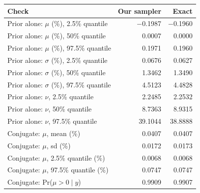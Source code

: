 \begin{tabular}{lrr}
\toprule
Check & Our sampler & Exact \\
\midrule
Prior alone: $\mu$ (\%), 2.5\% quantile & $-$0.1987 & $-$0.1960 \\
Prior alone: $\mu$ (\%), 50\% quantile & 0.0007 & 0.0000 \\
Prior alone: $\mu$ (\%), 97.5\% quantile & 0.1971 & 0.1960 \\
Prior alone: $\sigma$ (\%), 2.5\% quantile & 0.0676 & 0.0627 \\
Prior alone: $\sigma$ (\%), 50\% quantile & 1.3462 & 1.3490 \\
Prior alone: $\sigma$ (\%), 97.5\% quantile & 4.5123 & 4.4828 \\
Prior alone: $\nu$, 2.5\% quantile & 2.2485 & 2.2532 \\
Prior alone: $\nu$, 50\% quantile & 8.7363 & 8.9315 \\
Prior alone: $\nu$, 97.5\% quantile & 39.1044 & 38.8888 \\
Conjugate: $\mu$, mean (\%) & 0.0407 & 0.0407 \\
Conjugate: $\mu$, sd (\%) & 0.0172 & 0.0173 \\
Conjugate: $\mu$, 2.5\% quantile (\%) & 0.0068 & 0.0068 \\
Conjugate: $\mu$, 97.5\% quantile (\%) & 0.0747 & 0.0747 \\
Conjugate: Pr($\mu > 0 \mid y$) & 0.9909 & 0.9907 \\
\bottomrule
\end{tabular}
